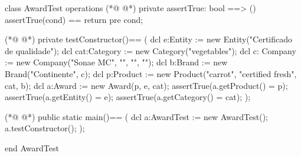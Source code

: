 \begin{vdmpp}[breaklines=true]
class AwardTest
 operations
(*@
\label{assertTrue:3}
@*)
  private assertTrue: bool ==> ()
    assertTrue(cond) == return
    pre cond;
    
(*@
\label{testConstructor:7}
@*)
  private testConstructor()==
  (
   dcl e:Entity := new Entity("Certificado de qualidade");
   dcl cat:Category := new Category("vegetables"); 
      dcl c: Company := new Company("Sonae MC", "", "", "");
   dcl b:Brand := new Brand("Continente", c);
   dcl p:Product := new Product("carrot", "certified fresh", cat, b);
   dcl a:Award := new Award(p, e, cat);
   assertTrue(a.getProduct() = p);
   assertTrue(a.getEntity() = e);
   assertTrue(a.getCategory() = cat);
  );
  
(*@
\label{main:20}
@*)
  public static main()==
    (
   dcl a:AwardTest := new AwardTest();
   a.testConstructor();
    );
     
end AwardTest
\end{vdmpp}
